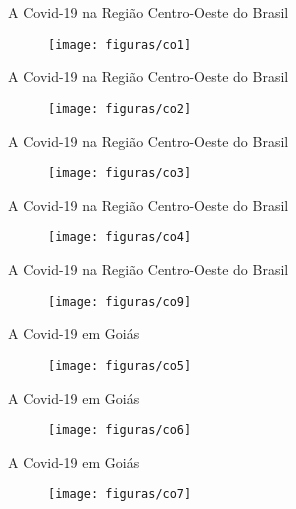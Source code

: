 \documentclass[xcolor=table,t]{beamer}
\begin{document}
\begin{frame}[c]{A Covid-19 na Região Centro-Oeste do Brasil}
\begin{figure}
	\centering
	\texttt{[image: figuras/co1]}
\end{figure}
\end{frame}

\begin{frame}[c]{A Covid-19 na Região Centro-Oeste do Brasil}
\begin{figure}
	\centering
	\texttt{[image: figuras/co2]}
\end{figure}
\end{frame}

\begin{frame}[c]{A Covid-19 na Região Centro-Oeste do Brasil}
\begin{figure}
	\centering
	\texttt{[image: figuras/co3]}
\end{figure}
\end{frame}

\begin{frame}[c]{A Covid-19 na Região Centro-Oeste do Brasil}
\begin{figure}
	\centering
	\texttt{[image: figuras/co4]}
\end{figure}
\end{frame}

\begin{frame}[c]{A Covid-19 na Região Centro-Oeste do Brasil}
\begin{figure}
	\centering
	\texttt{[image: figuras/co9]}
\end{figure}
\end{frame}

\begin{frame}[c]{A Covid-19 em Goiás}
\begin{figure}
	\centering
	\texttt{[image: figuras/co5]}
\end{figure}
\end{frame}

\begin{frame}[c]{A Covid-19 em Goiás}
\begin{figure}
	\centering
	\texttt{[image: figuras/co6]}
\end{figure}
\end{frame}

\begin{frame}[c]{A Covid-19 em Goiás}
\begin{figure}
	\centering
	\texttt{[image: figuras/co7]}
\end{figure}
\end{frame}
\end{document}
